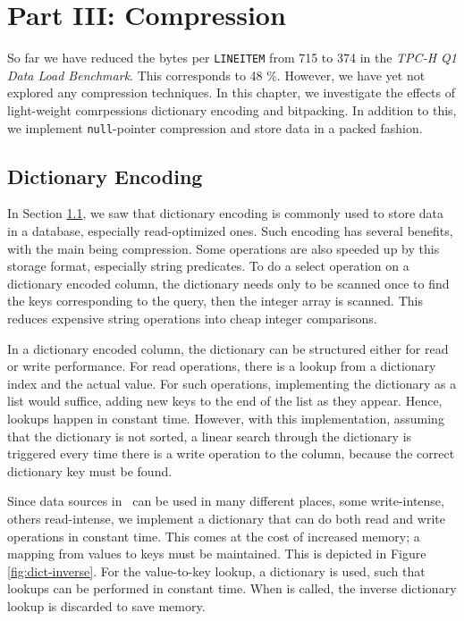 \chapter{Part III: Compression}
\label{chap:compression}
So far we have reduced the bytes per \texttt{LINEITEM} from 715 to 374 in the \textit{TPC-H Q1 Data Load Benchmark}. This corresponds to 48 \%. However, we have yet not explored any compression techniques. In this chapter, we investigate the effects of light-weight comrpessions dictionary encoding and bitpacking. In addition to this, we implement \texttt{null}-pointer compression and store data in a packed fashion.

\clearpage

\section{Dictionary Encoding}
\label{sec:Dictionary Encoding}
In Section \ref{sec:Dictionary Encoding}, we saw that dictionary encoding is commonly used to store data in a database, especially read-optimized ones. Such encoding has several benefits, with the main being compression. Some operations are also speeded up by this storage format, especially string predicates. To do a select operation on a dictionary encoded column, the dictionary needs only to be scanned once to find the keys corresponding to the query, then the integer array is scanned. This reduces expensive string operations into cheap integer comparisons.

In a dictionary encoded column, the dictionary can be structured either for read or write performance. For read operations, there is a lookup from a dictionary index and the actual value. For such operations, implementing the dictionary as a list would suffice, adding new keys to the end of the list as they appear. Hence, lookups happen in constant time. However, with this implementation, assuming that the dictionary is not sorted, a linear search through the dictionary is triggered every time there is a write operation to the column, because the correct dictionary key must be found. 

Since data sources in \gap~can be used in many different places, some write-intense, others read-intense, we implement a dictionary that can do both read and write operations in constant time. This comes at the cost of increased memory; a mapping from values to keys must be maintained. This is depicted in Figure \ref{fig:dict-inverse}. For the value-to-key lookup, a dictionary is used, such that lookups can be performed in constant time. When  is called, the inverse dictionary lookup is discarded to save memory. 

